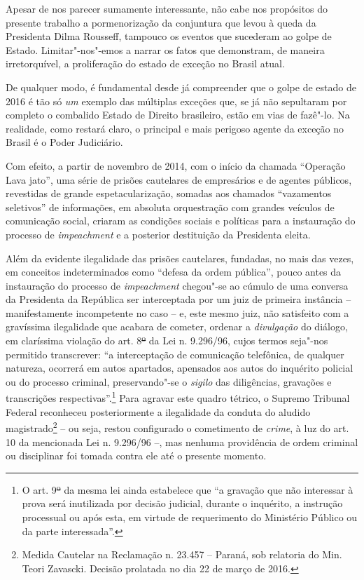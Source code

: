 Apesar de nos parecer sumamente interessante, não cabe nos propósitos do
presente trabalho a pormenorização da conjuntura que levou à queda da
Presidenta Dilma Rousseff, tampouco os eventos que sucederam ao golpe de
Estado. Limitar"-nos"-emos a narrar os fatos que demonstram, de maneira
irretorquível, a proliferação do estado de exceção no Brasil atual.

De qualquer modo, é fundamental desde já compreender que o golpe de
estado de 2016 é tão só \emph{um} exemplo das múltiplas exceções que, se
já não sepultaram por completo o combalido Estado de Direito brasileiro,
estão em vias de fazê"-lo. Na realidade, como restará claro, o principal
e mais perigoso agente da exceção no Brasil é o Poder Judiciário.

Com efeito, a partir de novembro de 2014, com o início da chamada
``Operação Lava jato'', uma série de prisões cautelares de empresários e
de agentes públicos, revestidas de grande espetacularização, somadas aos
chamados ``vazamentos seletivos'' de informações, em absoluta
orquestração com grandes veículos de comunicação social, criaram as
condições sociais e políticas para a instauração do processo de
\emph{impeachment} e a posterior destituição da Presidenta eleita.

Além da evidente ilegalidade das prisões cautelares, fundadas, no mais
das vezes, em conceitos indeterminados como ``defesa da ordem pública'',
pouco antes da instauração do processo de \emph{impeachment} chegou"-se
ao cúmulo de uma conversa da Presidenta da República ser interceptada
por um juiz de primeira instância -- manifestamente incompetente no caso
-- e, este mesmo juiz, não satisfeito com a gravíssima ilegalidade que
acabara de cometer, ordenar a \emph{divulgação} do diálogo, em
claríssima violação do art. 8\sout{º} da Lei n. 9.296/96, cujos termos
seja"-nos permitido transcrever: ``a interceptação de comunicação
telefônica, de qualquer natureza, ocorrerá em autos apartados, apensados
aos autos do inquérito policial ou do processo criminal, preservando"-se
o \emph{sigilo} das diligências, gravações e transcrições
respectivas''.\footnote{O art. 9\sout{º} da mesma lei ainda estabelece
  que ``a gravação que não interessar à prova será inutilizada por
  decisão judicial, durante o inquérito, a instrução processual ou após
  esta, em virtude de requerimento do Ministério Público ou da parte
  interessada''.} Para agravar este quadro tétrico, o Supremo Tribunal
Federal reconheceu posteriormente a ilegalidade da conduta do aludido
magistrado\footnote{Medida Cautelar na Reclamação n. 23.457 -- Paraná,
  sob relatoria do Min. Teori Zavascki. Decisão prolatada no dia 22 de
  março de 2016.} -- ou seja, restou configurado o cometimento de
\emph{crime}, à luz do art. 10 da mencionada Lei n. 9.296/96 --, mas
nenhuma providência de ordem criminal ou disciplinar foi tomada contra
ele até o presente momento.


